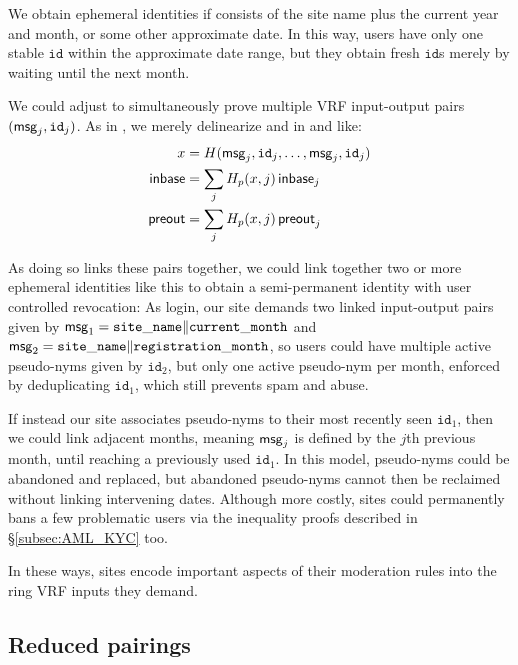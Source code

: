 We obtain ephemeral identities if \msg consists of the site name plus
the current year and month, or some other approximate date.
In this way, users have only one stable $\mathtt{id}$ within the
approximate date range, but they obtain fresh $\mathtt{id}$s merely
by waiting until the next month.

We could adjust \PedVRF to simultaneously prove multiple VRF input-output
pairs $(\mathsf{msg}_j,\mathtt{id}_j)$.
As in \cite{PrivacyPass}, we merely delinearize \In and \PreOut in
\rSign and \rVerify like:
\begin{align*}
x &= H(\mathsf{msg}_j,\mathtt{id}_j,\ldots,\mathsf{msg}_j,\mathtt{id}_j) \\
{\mathsf{inbase}} &= \sum_j H_p(x,j) \, {\mathsf{inbase}}_j \\
{\mathsf{preout}} &= \sum_j H_p(x,j) \, {\mathsf{preout}}_j \\
\end{align*}

As doing so links these pairs together,
we could link together two or more ephemeral identities like this
to obtain a semi-permanent identity with user controlled revocation:
As login, our site demands two linked input-output pairs given by
 $\mathsf{msg}_1 = \mathtt{site\_name} \| \mathtt{current\_month}$ and
 $\mathsf{msg}_2 = \mathtt{site\_name} \| \mathtt{registration\_month}$,
so users could have multiple active pseudo-nyms given by $\mathtt{id}_2$,
but only one active pseudo-nym per month, enforced by deduplicating
 $\mathtt{id}_1$, which still prevents spam and abuse.

If instead our site associates pseudo-nyms to their most recently seen
$\mathtt{id}_1$, then we could link adjacent months, meaning $\mathsf{msg}_j$
is defined by the $j$th previous month, until reaching a previously used $\mathtt{id}_1$.
In this model, pseudo-nyms could be abandoned and replaced, but
abandoned pseudo-nyms cannot then be reclaimed without linking intervening dates.
Although more costly, sites could permanently bans a few problematic
users via the inequality proofs described in \S\ref{subsec:AML_KYC} too.

In these ways, sites encode important aspects of their moderation rules
into the ring VRF inputs they demand.  


\subsection{Reduced pairings}
\label{sec:reduced_pairings}

